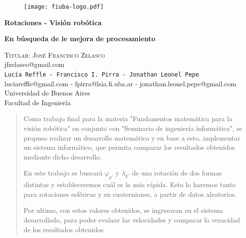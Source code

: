 \documentclass[spanish]{article}
\date{\today}
\begin{document}
\begin{titlepage}

\begin{figure}[htb]
\begin{center}
\texttt{[image: fiuba-logo.pdf]}
\end{center}
\end{figure}

\vspace*{0.45in}
\begin{center}
\begin{Huge}
\textbf{Rotaciones - Visión robótica}\\
\end{Huge}
\vspace*{0.25in}
\begin{Large}
\textbf{En búsqueda de le mejora de procesamiento}\\
\end{Large}

\vspace*{0.35in}
 \large
  \textsc{Titular: José Francisco Zelasco}\\
  \normalsize  jfzelasco@gmail.com \\
  \vspace*{0.25in}
  \large
  \texttt{Lucía Reffle - Francisco I. Pirra - Jonathan Leonel Pepe}\\
  \normalsize luciareffle@gmail.com  - fpirra@lsia.fi.uba.ar - jonathan.leonel.pepe@gmail.com \\
  \normalsize Universidad de Buenos Aires\\
  \normalsize Facultad de Ingeniería \\
  \vspace{20mm}
  
  \thedate
\end{center}


\end{titlepage}
 

 \begin{abstract} 
Como trabajo final para la materia "Fundamentos matemática para la visión robótica" en conjunto con "Seminario de ingeniería informática", se propuso realizar un desarrollo matemático y en base a esto, implementar un sistema informático, que permita comparar los resultados obtenidos mediante dicho desarrollo. 
 
En este trabajo se buscará $\varphi_{p'}$ y $\lambda_{p'}$ de una rotación de dos formas distintas y estableceremos cuál es la más rápida. Esto lo haremos tanto para rotaciones esféricas y en cuaterniones, a partir de datos aleatorios.

Por ultimo, con estos valores obtenidos, se ingresaran en el sistema desarrollado, para poder evaluar las velocidades y comparar la veracidad de los resultados obtenidos
\end{abstract} 
  \clearpage
  \tableofcontents  %
  \clearpage
  \thispagestyle{fancy} %
\end{document}
